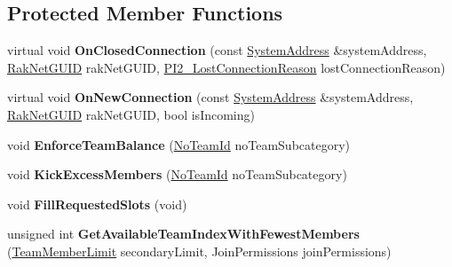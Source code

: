 \subsection*{Protected Member Functions}
\begin{DoxyCompactItemize}
\item 
\hypertarget{class_rak_net_1_1_t_m___world_adc8b73a26a77a846e723513148d530e7}{virtual void {\bfseries On\-Closed\-Connection} (const \hyperlink{struct_rak_net_1_1_system_address}{System\-Address} \&system\-Address, \hyperlink{struct_rak_net_1_1_rak_net_g_u_i_d}{Rak\-Net\-G\-U\-I\-D} rak\-Net\-G\-U\-I\-D, \hyperlink{group___p_l_u_g_i_n___i_n_t_e_r_f_a_c_e___g_r_o_u_p_ga376cc546fd6892c2ead48cd51796c8b8}{P\-I2\-\_\-\-Lost\-Connection\-Reason} lost\-Connection\-Reason)}\label{class_rak_net_1_1_t_m___world_adc8b73a26a77a846e723513148d530e7}

\item 
\hypertarget{class_rak_net_1_1_t_m___world_a8ae87ee03910daaddd6c149e284fb717}{virtual void {\bfseries On\-New\-Connection} (const \hyperlink{struct_rak_net_1_1_system_address}{System\-Address} \&system\-Address, \hyperlink{struct_rak_net_1_1_rak_net_g_u_i_d}{Rak\-Net\-G\-U\-I\-D} rak\-Net\-G\-U\-I\-D, bool is\-Incoming)}\label{class_rak_net_1_1_t_m___world_a8ae87ee03910daaddd6c149e284fb717}

\item 
\hypertarget{class_rak_net_1_1_t_m___world_a247e5d485f870eab43d2d47deb245752}{void {\bfseries Enforce\-Team\-Balance} (\hyperlink{group___t_e_a_m___m_a_n_a_g_e_r___g_r_o_u_p_gadd1e99b7724ceb0f6794f46de31a6b02}{No\-Team\-Id} no\-Team\-Subcategory)}\label{class_rak_net_1_1_t_m___world_a247e5d485f870eab43d2d47deb245752}

\item 
\hypertarget{class_rak_net_1_1_t_m___world_af061d61622db729e57598054788bd0e5}{void {\bfseries Kick\-Excess\-Members} (\hyperlink{group___t_e_a_m___m_a_n_a_g_e_r___g_r_o_u_p_gadd1e99b7724ceb0f6794f46de31a6b02}{No\-Team\-Id} no\-Team\-Subcategory)}\label{class_rak_net_1_1_t_m___world_af061d61622db729e57598054788bd0e5}

\item 
\hypertarget{class_rak_net_1_1_t_m___world_a84c7181fdd18b572b1f2cf543a3509c1}{void {\bfseries Fill\-Requested\-Slots} (void)}\label{class_rak_net_1_1_t_m___world_a84c7181fdd18b572b1f2cf543a3509c1}

\item 
\hypertarget{class_rak_net_1_1_t_m___world_a0c658b7962478bbbbe3bf677b10953c2}{unsigned int {\bfseries Get\-Available\-Team\-Index\-With\-Fewest\-Members} (\hyperlink{group___t_e_a_m___m_a_n_a_g_e_r___g_r_o_u_p_ga236290d3c5e0d6b3b4559ba851f02bed}{Team\-Member\-Limit} secondary\-Limit, Join\-Permissions join\-Permissions)}\label{class_rak_net_1_1_t_m___world_a0c658b7962478bbbbe3bf677b10953c2}


\end{DoxyCompactItemize}
